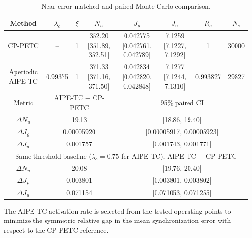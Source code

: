 \begin{table}[H]
\centering
\setlength{\tabcolsep}{3pt}
\caption{Near-error-matched and paired Monte Carlo comparison.}\label{tab:performance_matched}
\scriptsize
\begin{tabular}{cccccccc}
\toprule
Method & $\lambda_c$ & $\xi$ & $N_u$ & $J_\varrho$ & $J_u$ & $R_c$ & $N_s$ \\
\midrule
CP-PETC & -- & 1 & 352.20 [351.89, 352.51] & 0.042775 [0.042761, 0.042789] & 7.1259 [7.1227, 7.1292] & 1 & 30000 \\
Aperiodic AIPE-TC & 0.99375 & 1 & 371.33 [371.16, 371.50] & 0.042834 [0.042820, 0.042848] & 7.1277 [7.1244, 7.1310] & 0.993827 & 29827 \\
\midrule
Metric & \multicolumn{3}{c}{AIPE-TC $-$ CP-PETC} & \multicolumn{4}{c}{95\% paired CI} \\
$\Delta N_u$ & \multicolumn{3}{c}{19.13} & \multicolumn{4}{c}{[18.86, 19.40]} \\
$\Delta J_\varrho$ & \multicolumn{3}{c}{0.00005920} & \multicolumn{4}{c}{[0.00005917, 0.00005923]} \\
$\Delta J_u$ & \multicolumn{3}{c}{0.001757} & \multicolumn{4}{c}{[0.001743, 0.001771]} \\
\midrule
\multicolumn{8}{c}{Same-threshold baseline ($\lambda_c=0.75$ for AIPE-TC), AIPE-TC $-$ CP-PETC}\\
$\Delta N_u$ & \multicolumn{3}{c}{20.08} & \multicolumn{4}{c}{[19.76, 20.40]} \\
$\Delta J_\varrho$ & \multicolumn{3}{c}{0.003801} & \multicolumn{4}{c}{[0.003801, 0.003802]} \\
$\Delta J_u$ & \multicolumn{3}{c}{0.071154} & \multicolumn{4}{c}{[0.071053, 0.071255]} \\
\bottomrule
\end{tabular}
\par\smallskip The AIPE-TC activation rate is selected from the tested operating points to minimize the symmetric relative gap in the mean synchronization error with respect to the CP-PETC reference.
\end{table}
